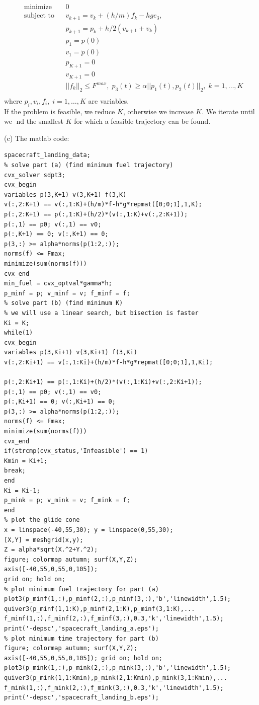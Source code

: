 \documentclass{article}
\begin{document}
\begin{align*}
	&\text{minimize} && 0\\
	&\text{subject to} 
	&&v_{k + 1} = v_{k} + (h / m) f_k- hge_3, \\
	& &&p_{k + 1} = p_k + h / 2 (v_{k + 1} + v_k)\\
	& && p_1 = p(0) \\
	& && v_1 = \dot{p}(0)\\
	& &&p_{K + 1} = 0 \\
	& && v_{K + 1} = 0 \\
	& && ||f_k||_2 \leq F^{max}, \; 
	p_3(t) \geq \alpha ||p_1(t), p_2(t)||_2, 
	\; k = 1, \dots, K\\
\end{align*} 
where $p_i, v_i, f_i, \; i = 1, \dots, K$ are variables.\\
If the problem is feasible, we reduce $K$, otherwise we increase $K$. We iterate until we nd the smallest $K$ for which a feasible trajectory can be found.

(c) The matlab code:

\begin{verbatim}
spacecraft_landing_data;
% solve part (a) (find minimum fuel trajectory)
cvx_solver sdpt3;
cvx_begin
variables p(3,K+1) v(3,K+1) f(3,K)
v(:,2:K+1) == v(:,1:K)+(h/m)*f-h*g*repmat([0;0;1],1,K);
p(:,2:K+1) == p(:,1:K)+(h/2)*(v(:,1:K)+v(:,2:K+1));
p(:,1) == p0; v(:,1) == v0;
p(:,K+1) == 0; v(:,K+1) == 0;
p(3,:) >= alpha*norms(p(1:2,:));
norms(f) <= Fmax;
minimize(sum(norms(f)))
cvx_end
min_fuel = cvx_optval*gamma*h;
p_minf = p; v_minf = v; f_minf = f;
% solve part (b) (find minimum K)
% we will use a linear search, but bisection is faster
Ki = K;
while(1)
cvx_begin
variables p(3,Ki+1) v(3,Ki+1) f(3,Ki)
v(:,2:Ki+1) == v(:,1:Ki)+(h/m)*f-h*g*repmat([0;0;1],1,Ki);

p(:,2:Ki+1) == p(:,1:Ki)+(h/2)*(v(:,1:Ki)+v(:,2:Ki+1));
p(:,1) == p0; v(:,1) == v0;
p(:,Ki+1) == 0; v(:,Ki+1) == 0;
p(3,:) >= alpha*norms(p(1:2,:));
norms(f) <= Fmax;
minimize(sum(norms(f)))
cvx_end
if(strcmp(cvx_status,'Infeasible') == 1)
Kmin = Ki+1;
break;
end
Ki = Ki-1;
p_mink = p; v_mink = v; f_mink = f;
end
% plot the glide cone
x = linspace(-40,55,30); y = linspace(0,55,30);
[X,Y] = meshgrid(x,y);
Z = alpha*sqrt(X.^2+Y.^2);
figure; colormap autumn; surf(X,Y,Z);
axis([-40,55,0,55,0,105]);
grid on; hold on;
% plot minimum fuel trajectory for part (a)
plot3(p_minf(1,:),p_minf(2,:),p_minf(3,:),'b','linewidth',1.5);
quiver3(p_minf(1,1:K),p_minf(2,1:K),p_minf(3,1:K),...
f_minf(1,:),f_minf(2,:),f_minf(3,:),0.3,'k','linewidth',1.5);
print('-depsc','spacecraft_landing_a.eps');
% plot minimum time trajectory for part (b)
figure; colormap autumn; surf(X,Y,Z);
axis([-40,55,0,55,0,105]); grid on; hold on;
plot3(p_mink(1,:),p_mink(2,:),p_mink(3,:),'b','linewidth',1.5);
quiver3(p_mink(1,1:Kmin),p_mink(2,1:Kmin),p_mink(3,1:Kmin),...
f_mink(1,:),f_mink(2,:),f_mink(3,:),0.3,'k','linewidth',1.5);
print('-depsc','spacecraft_landing_b.eps');	
\end{verbatim}	
\end{document}
